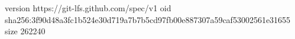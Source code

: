 version https://git-lfs.github.com/spec/v1
oid sha256:3f90d48a3fc1b524e30d719a7b7b5cd97fb00e887307a59caf53002561e31655
size 262240
